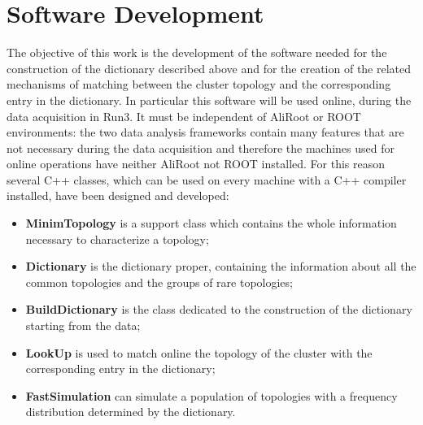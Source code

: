 \section{Software Development}
The objective of this work is the development of the software needed for the construction of the dictionary described above and for the creation of the related mechanisms of matching between the cluster topology and the corresponding entry in the dictionary. In particular this software will be used online, during the data acquisition in Run3. It must be independent of AliRoot or ROOT environments: the two data analysis frameworks contain many features that are not necessary during the data acquisition and therefore the machines used for online operations have neither AliRoot not ROOT installed. For this reason several C++ classes, which can be used on every machine with a C++ compiler installed, have been designed and developed:
\begin{itemize}
 \item \textbf{MinimTopology} is a support class which contains the whole information necessary to characterize a topology;
 \item \textbf{Dictionary} is the dictionary proper, containing the information about all the common topologies and the groups of rare topologies;
 \item \textbf{BuildDictionary} is the class dedicated to the construction of the dictionary starting from the data;
 \item \textbf{LookUp} is used to match online the topology of the cluster with the corresponding entry in the dictionary;
 \item \textbf{FastSimulation} can simulate a population of topologies with a frequency distribution determined by the dictionary. 
\end{itemize}

